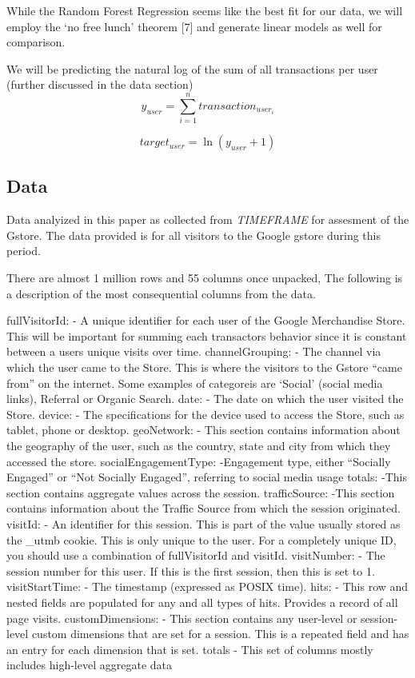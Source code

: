 \documentclass[]{tufte-handout}
\begin{document}
While the Random Forest Regression seems like the best fit for our data,
we will employ the `no free lunch' theorem {[}7{]} and generate linear
models as well for comparison.

We will be predicting the natural log of the sum of all transactions per
user (further discussed in the data section)
\[y_{user} = \sum_{i=1}^{n} transaction_{user_i}\]

\[target_{user} = \ln({y_{user}+1})\]

\hypertarget{data}{%
\subsection{Data}\label{data}}

Data analyized in this paper as collected from \emph{TIMEFRAME} for
assesment of the Gstore. The data provided is for all visitors to the
Google gstore during this period.

There are almost 1 million rows and 55 columns once unpacked, The
following is a description of the most consequential columns from the
data.

fullVisitorId: - A unique identifier for each user of the Google
Merchandise Store. This will be important for summing each transactors
behavior since it is constant between a users unique visits over time.
channelGrouping: - The channel via which the user came to the Store.
This is where the visitors to the Gstore ``came from'' on the internet.
Some examples of categoreis are `Social' (social media links), Referral
or Organic Search. date: - The date on which the user visited the Store.
device: - The specifications for the device used to access the Store,
such as tablet, phone or desktop. geoNetwork: - This section contains
information about the geography of the user, such as the country, state
and city from which they accessed the store. socialEngagementType:
-Engagement type, either ``Socially Engaged'' or ``Not Socially
Engaged'', referring to social media usage totals: -This section
contains aggregate values across the session. trafficSource: -This
section contains information about the Traffic Source from which the
session originated. visitId: - An identifier for this session. This is
part of the value usually stored as the \_utmb cookie. This is only
unique to the user. For a completely unique ID, you should use a
combination of fullVisitorId and visitId. visitNumber: - The session
number for this user. If this is the first session, then this is set to
1. visitStartTime: - The timestamp (expressed as POSIX time). hits: -
This row and nested fields are populated for any and all types of hits.
Provides a record of all page visits. customDimensions: - This section
contains any user-level or session-level custom dimensions that are set
for a session. This is a repeated field and has an entry for each
dimension that is set. totals - This set of columns mostly includes
high-level aggregate data
\end{document}
